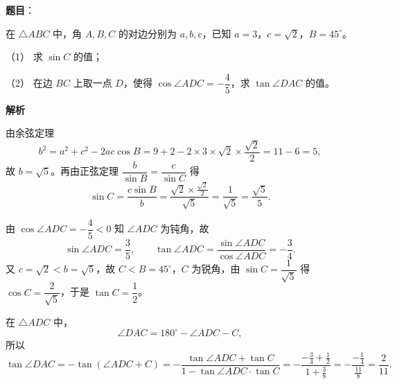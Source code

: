\begin{answer}

\textbf{题目}：

在 $\triangle ABC$ 中，角 $A,B,C$ 的对边分别为 $a,b,c$，已知 $a=3$，$c=\sqrt2$，$B=45^\circ$。

（1） 求 $\sin C$ 的值；

（2） 在边 $BC$ 上取一点 $D$，使得 $\cos\angle ADC=-\dfrac45$，求 $\tan\angle DAC$ 的值。
\nopagebreak[4]
\begin{center}\end{center}
\nopagebreak[4]
\textbf{解析}


由余弦定理
\nopagebreak[4]
\[b^2=a^2+c^2-2ac\cos B=9+2-2\times3\times\sqrt2\times\frac{\sqrt2}2=11-6=5,\]
故 $b=\sqrt5$。再由正弦定理 $\dfrac{b}{\sin B}=\dfrac{c}{\sin C}$ 得
\nopagebreak[4]
\[\sin C=\frac{c\sin B}{b}=\frac{\sqrt2\times\frac{\sqrt2}2}{\sqrt5}=\frac1{\sqrt5}=\frac{\sqrt5}5 .\]


由 $\cos\angle ADC=-\dfrac45<0$ 知 $\angle ADC$ 为钝角，故
\nopagebreak[4]
\[\sin\angle ADC=\frac35,\qquad \tan\angle ADC=\frac{\sin\angle ADC}{\cos\angle ADC}=-\frac34 .\]
又 $c=\sqrt2<b=\sqrt5$，故 $C<B=45^\circ$，$C$ 为锐角，由 $\sin C=\dfrac1{\sqrt5}$ 得 $\cos C=\dfrac2{\sqrt5}$，于是 $\tan C=\dfrac12$。

在 $\triangle ADC$ 中，
\nopagebreak[4]
\[\angle DAC=180^\circ-\angle ADC-C,\]
所以
\nopagebreak[4]
\[\tan\angle DAC=-\tan\left(\angle ADC+C\right)=-\frac{\tan\angle ADC+\tan C}{1-\tan\angle ADC\cdot\tan C}
=-\frac{-\frac34+\frac12}{1+\frac38}=-\frac{-\frac14}{\frac{11}8}=\frac2{11}.\]



\end{answer}
